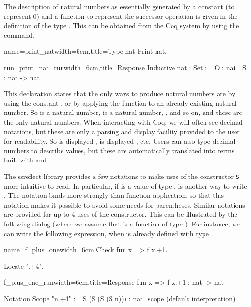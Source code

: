 The description of natural numbers as essentially generated by a
constant  (to represent 0) and a function  to represent 
the successor operation is given in the definition of the type
. This can
be obtained from the Coq system by using the  command.

\begin{coq}{name=print_nat}{width=6cm,title=Type nat}
Print nat.

\end{coq}
\begin{coqout}{run=print_nat_run}{width=6cm,title=Response}
Inductive nat : Set :=  O : nat | S : nat -> nat
\end{coqout}

This declaration states that the only ways to produce natural numbers
are by using the constant , or by applying the function  to
an already existing natural number.  So  is a natural number,  is a
natural number, , and so on, and these are the only natural
numbers.  When interacting with Coq, we will often see decimal
notations, but these are only a parsing and display
facility provided to the user for readability.  So  is displayed
,  is displayed , etc.  Users can also type decimal
numbers to describe values, but these are automatically translated into
terms built with  and .

The ssreflect library provides a few notations to make uses of the
constructor {\tt S} more intuitive to read.  In particular, if 
is a value of type ,  is another way to write .  The  notation binds more strongly than function
application, so that this notation makes it possible to avoid some
needs for parentheses.
Similar notations are provided for up to 4 uses of the 
constructor.  This can be illustrated by the following dialog (where
we assume that  is a function of type ).
  For instance, we can write the following
expression, when  is already defined with type .

\begin{coq}{name=f_plus_one}{width=6cm}
Check fun x => f x.+1.

Locate ".+4".
$~$
$~$
$~$
\end{coq}
\begin{coqout}{f_plus_one_run}{width=6cm,title=Response}
fun x => f x.+1 : nat -> nat

Notation        Scope
"n.+4" := S (S (S (S n)))  : nat_scope
    (default interpretation)
\end{coqout}

